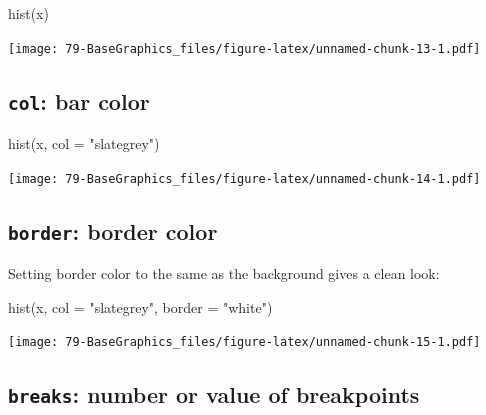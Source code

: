 \documentclass[
]{book}
\newenvironment{Shaded}{\begin{snugshade}}{\end{snugshade}}
\newcommand{\AttributeTok}[1]{\textcolor[rgb]{0.77,0.63,0.00}{#1}}
\newcommand{\FunctionTok}[1]{\textcolor[rgb]{0.00,0.00,0.00}{#1}}
\newcommand{\NormalTok}[1]{#1}
\newcommand{\StringTok}[1]{\textcolor[rgb]{0.31,0.60,0.02}{#1}}
\begin{document}
\begin{Shaded}
\begin{Highlighting}[]
\FunctionTok{hist}\NormalTok{(x)}
\end{Highlighting}
\end{Shaded}

\texttt{[image: 79-BaseGraphics\_files/figure-latex/unnamed-chunk-13-1.pdf]}

\hypertarget{col-bar-color}{%
\subsection{\texorpdfstring{\textbf{\texttt{col}}: bar color}{col: bar color}}\label{col-bar-color}}

\begin{Shaded}
\begin{Highlighting}[]
\FunctionTok{hist}\NormalTok{(x, }\AttributeTok{col =} \StringTok{"slategrey"}\NormalTok{)}
\end{Highlighting}
\end{Shaded}

\texttt{[image: 79-BaseGraphics\_files/figure-latex/unnamed-chunk-14-1.pdf]}

\hypertarget{border-border-color}{%
\subsection{\texorpdfstring{\textbf{\texttt{border}}: border color}{border: border color}}\label{border-border-color}}

Setting border color to the same as the background gives a clean look:

\begin{Shaded}
\begin{Highlighting}[]
\FunctionTok{hist}\NormalTok{(x, }\AttributeTok{col =} \StringTok{"slategrey"}\NormalTok{, }\AttributeTok{border =} \StringTok{"white"}\NormalTok{)}
\end{Highlighting}
\end{Shaded}

\texttt{[image: 79-BaseGraphics\_files/figure-latex/unnamed-chunk-15-1.pdf]}

\hypertarget{breaks-number-or-value-of-breakpoints}{%
\subsection{\texorpdfstring{\texttt{breaks}: number or value of breakpoints}{breaks: number or value of breakpoints}}\label{breaks-number-or-value-of-breakpoints}}
\end{document}

